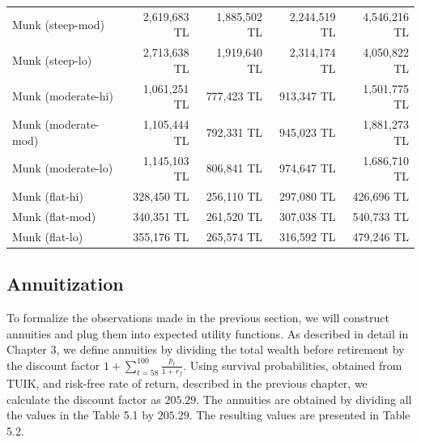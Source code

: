 \begin{table}
\begin{tabular}[c]{lrrrr}
		Munk (steep-mod) & 2,619,683 TL&1,885,502 TL&2,244,519 TL&4,546,216 TL\\	
		Munk (steep-lo) & 2,713,638 TL&1,919,640 TL&2,314,174 TL&4,050,822 TL\\
		Munk (moderate-hi) & 1,061,251 TL&777,423 TL&913,347 TL&1,501,775 TL\\
		Munk (moderate-mod) & 1,105,444 TL&792,331 TL&945,023 TL&1,881,273 TL\\	
		Munk (moderate-lo) & 1,145,103 TL&806,841 TL&974,647 TL&1,686,710 TL\\
		Munk (flat-hi) & 328,450 TL&256,110 TL&297,080 TL&426,696 TL\\
		Munk (flat-mod) & 340,351 TL&261,520 TL&307,038 TL&540,733 TL\\	
		Munk (flat-lo) & 355,176 TL&265,574 TL&316,592 TL&479,246 TL\\
		\hline
	\end{tabular}
\end{table}
\resetgeometry

\subsection{Annuitization}
To formalize the observations made in the previous section, we will construct annuities and plug them into expected utility functions. As described in detail in Chapter 3, we define annuities by dividing the total wealth before retirement by the discount factor $1 + \sum^{100}_{t=58}\frac{p_t}{1+r_f}$. Using survival probabilities, obtained from TUIK, and risk-free rate of return, described in the previous chapter, we calculate the discount factor as $205.29$. The annuities are obtained by dividing all the values in the Table 5.1 by $205.29$. The resulting values are presented in Table 5.2. 

